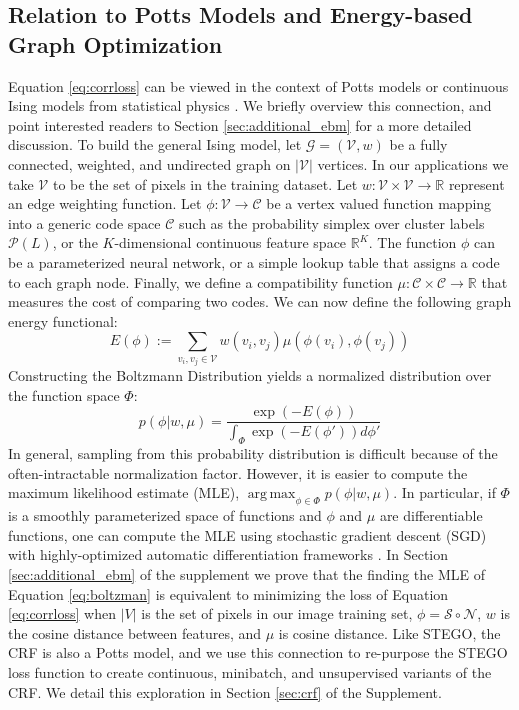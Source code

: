 \documentclass{article} \usepackage{iclr2022_conference,times}
\newcommand{\R}{\mathbb{R}}
\DeclareMathOperator*{\argmax}{arg\,max}
\begin{document}
\subsection{Relation to Potts Models and Energy-based Graph Optimization}
\label{sec:ebm}
\renewcommand{\R}{\mathbb{R}}
\newcommand{\G}{\mathcal{G}}
\newcommand{\V}{\mathcal{V}}
\newcommand{\C}{\mathcal{C}}
\newcommand{\F}{\mathcal{F}}
\renewcommand{\P}{\mathbb{P}}

Equation \ref{eq:corrloss} can be viewed in the context of Potts models or continuous Ising models from statistical physics \citep{potts1952some,baker1979continuous}. We briefly overview this connection, and point interested readers to Section \ref{sec:additional_ebm} for a more detailed discussion. To build the general Ising model, let $\G = (\V, w)$ be a fully connected, weighted, and undirected graph on $|\V|$ vertices. In our applications we take $\V$ to be the set of pixels in the training dataset. Let $w: \V \times \V \to \R$ represent an edge weighting function. Let $\phi: \V \to \C$ be a vertex valued function mapping into a generic code space $\C$ such as the probability simplex over cluster labels $\mathcal{P}(L)$, or the $K$-dimensional continuous feature space $\R^K$. The function $\phi$ can be a parameterized neural network, or a simple lookup table that assigns a code to each graph node. Finally, we define a compatibility function $\mu: \C \times \C \to \R$ that measures the cost of comparing two codes. We can now define the following graph energy functional:
\begin{equation}
    \label{eq:energy}
    E(\phi) := \sum_{v_i, v_j \in \V} w(v_i, v_j) \mu(\phi(v_i), \phi(v_j))
\end{equation}
Constructing the Boltzmann Distribution \citep{hinton2002training} yields a normalized distribution over the function space $\Phi$:
\begin{equation}
    \label{eq:boltzman}
    p(\phi | w, \mu ) = \frac{\exp(-E(\phi))}{\int_\Phi \exp(-E(\phi')) d\phi'}
\end{equation}
In general, sampling from this probability distribution is difficult because of the often-intractable normalization factor. However, it is easier to compute the maximum likelihood estimate (MLE),
$\argmax_{\phi \in \Phi} p(\phi | w, \mu )$. In particular, if $\Phi$ is a smoothly parameterized space of functions and $\phi$ and $\mu$ are differentiable functions, one can compute the MLE using stochastic gradient descent (SGD) with highly-optimized automatic differentiation frameworks \citep{pytorch,tensorflow}. In Section \ref{sec:additional_ebm} of the supplement we prove that the finding the MLE of Equation \ref{eq:boltzman} is equivalent to minimizing the loss of Equation \ref{eq:corrloss} when $|V|$ is the set of pixels in our image training set, $\phi  = \mathcal{S} \circ \mathcal{N}$, $w$ is the cosine distance between features, and $\mu$ is cosine distance. Like STEGO, the CRF is also a Potts model, and we use this connection to re-purpose the STEGO loss function to create continuous, minibatch, and unsupervised variants of the CRF. We detail this exploration in Section \ref{sec:crf} of the Supplement. 
\end{document}

